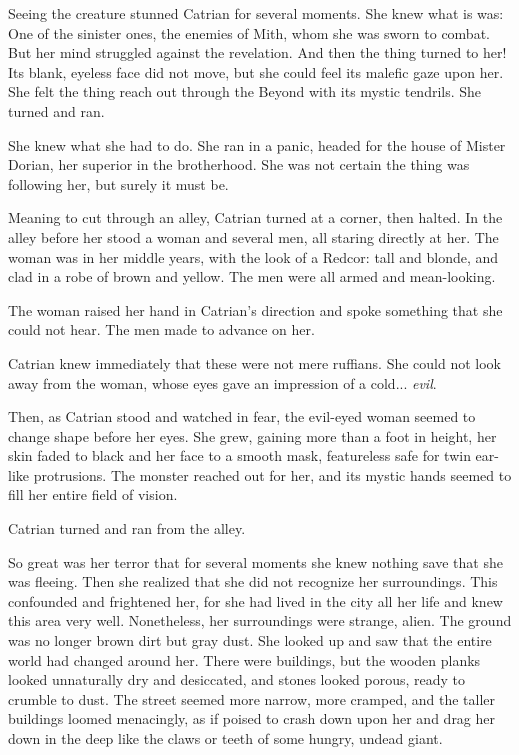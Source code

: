Seeing the creature stunned Catrian for several moments. She knew what is was: One of the sinister ones, the enemies of Mith, whom she was sworn to combat. But her mind struggled against the revelation. And then the thing turned to her! Its blank, eyeless face did not move, but she could feel its malefic gaze upon her. She felt the thing reach out through the Beyond with its mystic tendrils. She turned and ran. 

She knew what she had to do.  She ran in a panic, headed for the house of Mister Dorian, her superior in the brotherhood. She was not certain the thing was following her, but surely it must be. 

Meaning to cut through an alley, Catrian turned at a corner, then halted. In the alley before her stood a woman and several men, all staring directly at her. 
The woman was in her middle years, with the look of a Redcor: tall and blonde, and clad in a robe of brown and yellow. 
The men were all armed and mean-looking. 

The woman raised her hand in Catrian's direction and spoke something that she could not hear. The men made to advance on her.

Catrian knew immediately that these were not mere ruffians.  She could not look away from the woman, whose eyes gave an impression of a cold... \emph{evil}. 

Then, as Catrian stood and watched in fear, the evil-eyed woman seemed to change shape before her eyes. She grew, gaining more than a foot in height, her skin faded to black and her face to a smooth mask, featureless safe for twin ear-like protrusions.  The monster reached out for her, and its mystic hands seemed to fill her entire field of vision. 

Catrian turned and ran from the alley. 

So great was her terror that for several moments she knew nothing save that she was fleeing. Then she realized that she did not recognize her surroundings. This confounded and frightened her, for she had lived in the city all her life and knew this area very well.
Nonetheless, her surroundings were strange, alien. The ground was no longer brown dirt but gray dust. She looked up and saw that the entire world had changed around her. There were buildings, but the wooden planks looked unnaturally dry and desiccated, and stones looked porous, ready to crumble to dust. The street seemed more narrow, more cramped, and the taller buildings loomed menacingly, as if poised to crash down upon her and drag her down in the deep like the claws or teeth of some hungry, undead giant. 

